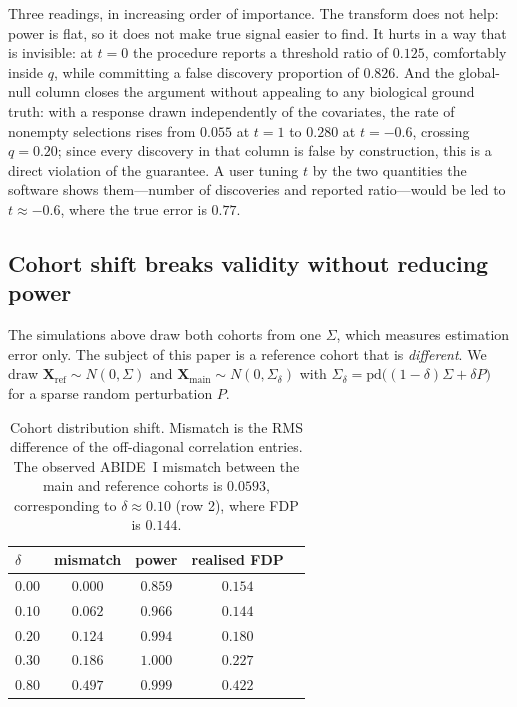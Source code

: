 \documentclass[11pt,a4paper]{article}
\newcommand{\X}{\mathbf{X}}
\begin{document}
Three readings, in increasing order of importance. The transform does not
help: power is flat, so it does not make true signal easier to find. It
hurts in a way that is invisible: at $t=0$ the procedure reports a threshold
ratio of $0.125$, comfortably inside $q$, while committing a false discovery
proportion of $0.826$. And the global-null column closes the argument
without appealing to any biological ground truth: with a response drawn
independently of the covariates, the rate of nonempty selections rises from
$0.055$ at $t=1$ to $0.280$ at $t=-0.6$, crossing $q=0.20$; since every
discovery in that column is false by construction, this is a direct
violation of the guarantee. A user tuning $t$ by the two quantities the
software shows them---number of discoveries and reported ratio---would be
led to $t\approx-0.6$, where the true error is $0.77$.

\subsection{Cohort shift breaks validity without reducing power}
\label{sec:shift}

The simulations above draw both cohorts from one $\Sigma$, which measures
estimation error only. The subject of this paper is a reference cohort that
is \emph{different}. We draw $\X_{\mathrm{ref}}\sim N(0,\Sigma)$ and
$\X_{\mathrm{main}}\sim N(0,\Sigma_\delta)$ with $\Sigma_\delta=
\mathrm{pd}\big((1-\delta)\Sigma+\delta P\big)$ for a sparse random
perturbation $P$.

\begin{table}[htbp]
\centering
{\small\setlength{\tabcolsep}{6pt}
\begin{tabular}{lcccc}
\toprule
$\delta$ & mismatch & power & realised FDP \\
\midrule
$0.00$ & $0.000$ & $0.859$ & $0.154$ \\
$0.10$ & $0.062$ & $0.966$ & $0.144$ \\
$0.20$ & $0.124$ & $0.994$ & $0.180$ \\
$0.30$ & $0.186$ & $1.000$ & $\mathbf{0.227}$ \\
$0.80$ & $0.497$ & $0.999$ & $\mathbf{0.422}$ \\
\bottomrule
\end{tabular}}
\caption{Cohort distribution shift. Mismatch is the RMS difference of the
off-diagonal correlation entries. The observed ABIDE~I mismatch between the
main and reference cohorts is $0.0593$, corresponding to $\delta\approx0.10$
(row 2), where FDP is $0.144$.}
\label{tab:shift}
\end{table}
\end{document}
